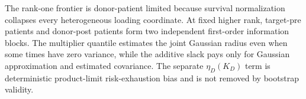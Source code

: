 The rank-one frontier is donor-patient limited because survival normalization collapses every heterogeneous loading coordinate. At fixed higher rank, target-pre patients and donor-post patients form two independent first-order information blocks. The multiplier quantile estimates the joint Gaussian radius even when some times have zero variance, while the additive slack pays only for Gaussian approximation and estimated covariance. The separate \(\eta_D(K_D)\) term is deterministic product-limit risk-exhaustion bias and is not removed by bootstrap validity.